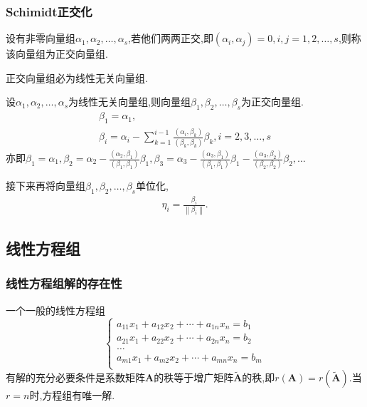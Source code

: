 \subsubsection{Schimidt正交化}

\begin{definition}
    设有非零向量组$\alpha_1,\alpha_2,\dots,\alpha_s$,若他们两两正交,即$(\alpha_i,\alpha_j)=0,i,j=1,2,\dots,s$,则称该向量组为正交向量组.
\end{definition}
\begin{ttheorem}
    正交向量组必为线性无关向量组.
\end{ttheorem}
设$\alpha_1,\alpha_2,\dots,\alpha_s$为线性无关向量组,则向量组$\beta_1,\beta_2,\dots,\beta_s$为正交向量组.
\begin{gather*}
    \beta_1=\alpha_1,\\
    \beta_i=\alpha_i-\sum_{k=1}^{i-1} \frac{(\alpha_i,\beta_k)}{(\beta_k,\beta_k)}\beta_k,i=2,3,\dots,s
\end{gather*}
亦即$\beta_1=\alpha_1,\beta_2=\alpha_2-\frac{(\alpha_2,\beta_1)}{(\beta_1,\beta_1)}\beta_1,\beta_3=\alpha_3-\frac{(\alpha_3,\beta_1)}{(\beta_1,\beta_1)}\beta_1-\frac{(\alpha_3,\beta_2)}{(\beta_2,\beta_2)}\beta_2,\dots$

接下来再将向量组$\beta_1,\beta_2,\dots,\beta_s$单位化,
\begin{gather*}
    \eta _i=\frac{\beta_i}{\left\lVert \beta_i \right\rVert }.
\end{gather*}

\subsection{线性方程组}
\subsubsection{线性方程组解的存在性}

\begin{ttheorem}
    一个一般的线性方程组
    \begin{equation*}
        \begin{cases}
            a_{11}x_1+a_{12}x_2+\dotsm+a_{1n}x_n= b_1 \\
            a_{21}x_1+a_{22}x_2+\dotsm+a_{2n}x_n= b_2 \\
            \dots \\
            a_{m1}x_1+a_{m2}x_2+\dotsm+a_{mn}x_n= b_m \\
        \end{cases}
    \end{equation*}
    有解的充分必要条件是系数矩阵$\mathbf{A}$的秩等于增广矩阵$\widetilde{\mathbf{A}} $的秩,即$r(\mathbf{A})=r(\widetilde{\mathbf{A}} )$.当$r=n$时,方程组有唯一解.
\end{ttheorem}

